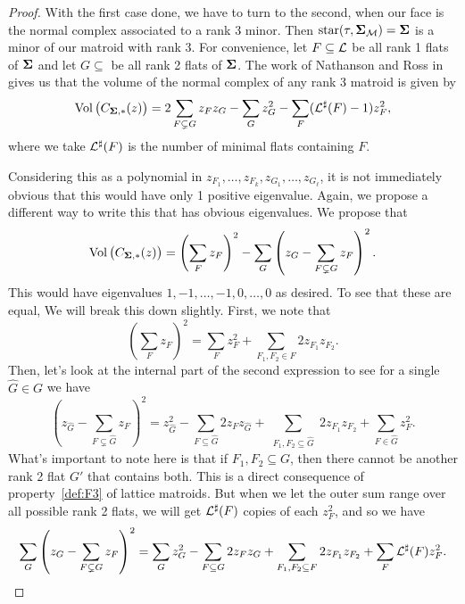 \documentclass[12pt,oneside]{../../sfsuthesis}
\begin{document}
\begin{proof}
    With the first case done, we have to turn to the second, when our face is the normal complex associated to a rank 3 minor.
    Then \( \operatorname{star}(\tau, \bm{\Sigma}_{\mathcal{M}}) = \bm{\Sigma} \) is a minor of our matroid with rank 3.
    For convenience, let \( F \subseteq \mathcal{L} \) be all rank 1 flats of \( \bm{\Sigma} \) and let \( G \subseteq \) be all rank 2 flats of \( \bm{\Sigma} \).
    The work of Nathanson and Ross in \cite{nathansonTropicalFansNormal2023} gives us that the volume of the normal complex of any rank 3 matroid is given by
    \[
        \operatorname{Vol}\big(C_{\bm{\Sigma}, \ast}(z)\big) = 2\sum_{F \subsetneq G} z_F z_G - \sum_{G} z_G^2 - \sum_{F}(\mathcal{L}^\sharp(F) - 1)z_F^2,
    \]
    where we take \( \mathcal{L}^\sharp(F) \) is the number of minimal flats containing \( F \).

    Considering this as a polynomial in \( z_{F_1}, \dots, z_{F_k}, z_{G_1}, \dots, z_{G_\ell} \), it is not immediately obvious that this would have only 1 positive eigenvalue.
    Again, we propose a different way to write this that has obvious eigenvalues.
    We propose that
    \[
        \operatorname{Vol}\big(C_{\bm{\Sigma}, \ast}(z)\big) = \left( \sum_F z_F\right)^2 - \sum_G \left( z_G - \sum_{F \subsetneq G} z_F\right)^2.
    \]
    This would have eigenvalues \( 1, -1, \dots, -1, 0, \dots, 0 \) as desired.
    To see that these are equal, We will break this down slightly.
    First, we note that
    \begin{equation}
        \left( \sum_F z_F\right)^2 = \sum_F z_F^2 + \sum_{F_1, F_2 \in F} 2z_{F_1}z_{F_2}.
    \end{equation}
    Then, let's look at the internal part of the second expression to see for a single \( \hat{G} \in G \) we have
    \begin{equation}
        \left( z_{\hat{G}} - \sum_{F \subsetneq {\hat{G}}} z_F \right)^2 = z_{\hat{G}}^2 - \sum_{F \subseteq \hat{G}}2 z_F z_{\hat{G}} + \sum_{\substack{F_1,F_2 \subseteq \hat{G}}}2z_{F_1} z_{F_2} + \sum_{F \in \hat{G}} z_F^2.
    \end{equation}
    What's important to note here is that if \( F_1, F_2 \subseteq G \), then there cannot be another rank 2 flat \( G' \) that contains both.
    This is a direct consequence of property~\ref{def:F3} of lattice matroids.
    But when we let the outer sum range over all possible rank 2 flats, we will get \( \mathcal{L}^\sharp(F) \) copies of each \( z_F^2 \), and so we have
    \begin{equation}
        \sum_G \left( z_G - \sum_{F \subsetneq G} z_F\right)^2 =
        \sum_{G}z_G^2
        - \sum_{F \subseteq G}2 z_F z_{G}
        + \sum_{\substack{F_1,F_2 \subseteq F}}2z_{F_1} z_{F_2}
        + \sum_{F} \mathcal{L}^\sharp(F)z_F^2.
    \end{equation}


\end{proof}
\end{document}
